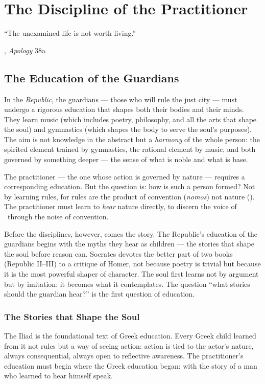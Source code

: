 \chapter{The Discipline of the Practitioner}

\epigraph{``The unexamined life is not worth living.''}{\textcite{plato1997complete}, \emph{Apology} 38a}

\section{The Education of the Guardians}

In the \emph{Republic}, the guardians --- those who will rule the just city ---
must undergo a rigorous education that shapes both their bodies and their minds.
They learn music (which includes poetry, philosophy, and all the arts that shape
the soul) and gymnastics (which shapes the body to serve the soul's purposes).
The aim is not knowledge in the abstract but a \emph{harmony} of the whole
person: the spirited element trained by gymnastics, the rational element by
music, and both governed by something deeper --- the sense of what is noble
and what is base.

The practitioner --- the one whose action is governed by nature --- requires a
corresponding education. But the question is: how is such a person formed? Not
by learning rules, for rules are the product of convention (\emph{nomos}) not
nature (\physis). The practitioner must learn to \emph{hear} nature directly,
to discern the voice of \physis\ through the noise of convention.

Before the disciplines, however, comes the story. The Republic's education of
the guardians begins with the myths they hear as children --- the stories that
shape the soul before reason can. Socrates devotes the better part of two books
(Republic II--III) to a critique of Homer, not because poetry is trivial but
because it is the most powerful shaper of character. The soul first learns not
by argument but by imitation: it becomes what it contemplates. The question
``what stories should the guardian hear?'' is the first question of education.

\subsection{The Stories that Shape the Soul}

The Iliad is the foundational text of Greek education. Every Greek child learned
from it not rules but a way of seeing action: action is tied to the actor's
nature, always consequential, always open to reflective awareness. The
practitioner's education must begin where the Greek education began: with the
story of a man who learned to hear himself speak.

